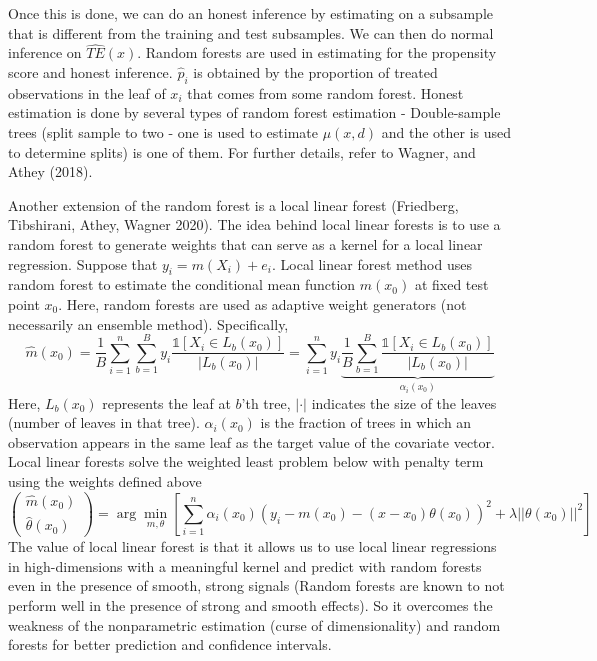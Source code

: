 \documentclass[12pt]{article}
\theoremstyle{definition}
\theoremstyle{property}
\theoremstyle{assumption}
\theoremstyle{example}
\theoremstyle{comment}
\begin{document}
Once this is done, we can do an honest inference by estimating on a subsample that is different from the training and test subsamples. We can then do normal inference on $\widehat{TE}(x)$. Random forests are used in estimating for the propensity score and honest inference. $\hat{p}_i$ is obtained by the proportion of treated observations in the leaf of $x_i$ that comes from some random forest. Honest estimation is done by several types of random forest estimation - Double-sample trees (split sample to two - one is used to estimate $\mu(x,d)$ and the other is used to determine splits) is one of them. For further details, refer to Wagner, and Athey (2018).    \par
Another extension of the random forest is a local linear forest (Friedberg, Tibshirani, Athey, Wagner 2020). The idea behind local linear forests is to use a random forest to generate weights that can serve as a kernel for a local linear regression. Suppose that $y_i=m(X_i)+e_i$. Local linear forest method uses random forest to estimate the conditional mean function $m(x_0)$ at fixed test point $x_0$. Here, random forests are used as adaptive weight generators (not necessarily an ensemble method). Specifically,
\[
\hat{m}(x_0)=\frac{1}{B}\sum_{i=1}^n \sum_{b=1}^By_i \frac{\mathbb{1}[X_i\in L_b(x_0)]}{|L_b(x_0)|}=\sum_{i=1}^n y_i \underbrace{\frac{1}{B}\sum_{b=1}^B\frac{\mathbb{1}[X_i\in L_b(x_0)]}{|L_b(x_0)|}}_{\alpha_i(x_0)}
\]
Here, $L_b(x_0)$ represents the leaf at $b$'th tree, $|\cdot|$ indicates the size of the leaves (number of leaves in that tree). $\alpha_i(x_0)$ is the fraction of trees in which an observation appears in the same leaf as the target value of the covariate vector. Local linear forests solve the weighted least problem below with penalty term using the weights defined above
\[
\begin{pmatrix} \hat{m}(x_0) \\ \hat{\theta}(x_0) \end{pmatrix} = \arg\min_{m,\theta}\left[ \sum_{i=1}^n \alpha_i(x_0) (y_i-m(x_0)-(x-x_0)\theta(x_0))^2 +\lambda ||\theta(x_0)||^2\right]
\]
The value of local linear forest is that it allows us to use local linear regressions in high-dimensions with a meaningful kernel and predict with random forests even in the presence of smooth, strong signals (Random forests are known to not perform well in the presence of strong and smooth effects). So it overcomes the weakness of the nonparametric estimation (curse of dimensionality) and random forests for better prediction and confidence intervals. 
\end{document}

